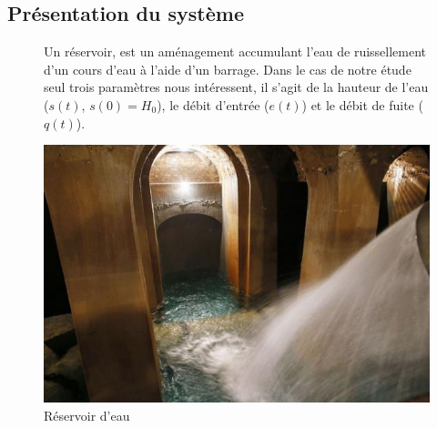 %
%
%
%
%
%
%
%
%

\subsection{Présentation du système}

\begin{figure}[htbp]
\begin{minipage}[c]{.48\linewidth}
Un réservoir, est un aménagement accumulant l'eau de ruissellement d'un cours d'eau à l'aide d'un barrage. Dans le cas de notre étude seul trois paramètres nous intéressent, il s'agit de la hauteur de l'eau ($s(t)$, $s(0)=H_0$), le débit d'entrée ($e(t)$) et le débit de fuite ($q(t)$).
\end{minipage}
\hfill
\begin{minipage}[c]{.50\linewidth}
\begin{center}
\includegraphics[width=0.8\linewidth]{img/reservoir.jpg}
\caption{Réservoir d'eau}
\label{fig:image5}
\end{center}
\end{minipage}
\end{figure}

